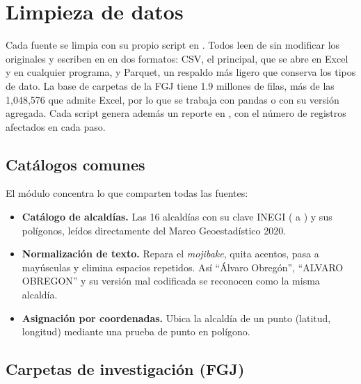 \section{Limpieza de datos}\label{sec:limpieza}

Cada fuente se limpia con su propio script en . Todos leen de
 sin modificar los originales y escriben en  en dos
formatos: CSV, el principal, que se abre en Excel y en cualquier programa, y Parquet, un respaldo más
ligero que conserva los tipos de dato. La base de carpetas de la FGJ tiene 1.9 millones de filas, más de
las 1,048,576 que admite Excel, por lo que se trabaja con pandas o con su versión agregada. Cada script genera además un reporte en , con el número
de registros afectados en cada paso.

\subsection{Catálogos comunes}
El módulo  concentra lo que comparten todas las fuentes:
\begin{itemize}
  \item \textbf{Catálogo de alcaldías.} Las 16 alcaldías con su clave INEGI ( a
        ) y sus polígonos, leídos directamente del Marco Geoestadístico 2020.
  \item \textbf{Normalización de texto.} Repara el \emph{mojibake}, quita acentos, pasa a
        mayúsculas y elimina espacios repetidos. Así \enquote{Álvaro Obregón}, \enquote{ALVARO OBREGON}
        y su versión mal codificada se reconocen como la misma alcaldía.
  \item \textbf{Asignación por coordenadas.} Ubica la alcaldía de un punto (latitud, longitud)
        mediante una prueba de punto en polígono.
\end{itemize}

\subsection{Carpetas de investigación (FGJ)}


